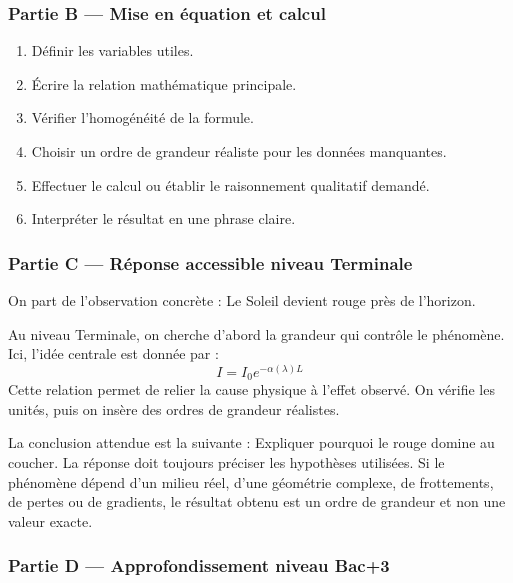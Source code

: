 \documentclass[11pt,a4paper]{article}
\begin{document}
\subsubsection*{Partie B — Mise en équation et calcul}

\begin{enumerate}
  \item Définir les variables utiles.
  \item Écrire la relation mathématique principale.
  \item Vérifier l'homogénéité de la formule.
  \item Choisir un ordre de grandeur réaliste pour les données manquantes.
  \item Effectuer le calcul ou établir le raisonnement qualitatif demandé.
  \item Interpréter le résultat en une phrase claire.
\end{enumerate}

\subsubsection*{Partie C — Réponse accessible niveau Terminale}

\begin{corrigebox}
On part de l'observation concrète : Le Soleil devient rouge près de l'horizon.

Au niveau Terminale, on cherche d'abord la grandeur qui contrôle le phénomène. Ici, l'idée centrale est donnée par :
\[
I=I_0e^{-\alpha(\lambda)L}
\]
Cette relation permet de relier la cause physique à l'effet observé. On vérifie les unités, puis on insère des ordres de grandeur réalistes.

La conclusion attendue est la suivante : Expliquer pourquoi le rouge domine au coucher. La réponse doit toujours préciser les hypothèses utilisées. Si le phénomène dépend d'un milieu réel, d'une géométrie complexe, de frottements, de pertes ou de gradients, le résultat obtenu est un ordre de grandeur et non une valeur exacte.
\end{corrigebox}

\subsubsection*{Partie D — Approfondissement niveau Bac+3}
\end{document}
